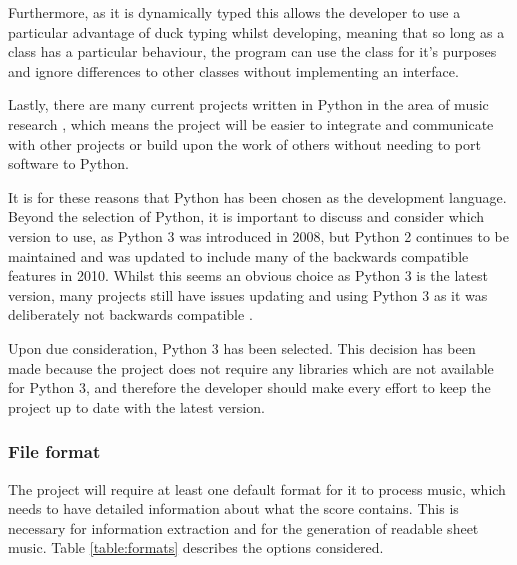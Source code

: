  Furthermore, as it is dynamically typed this allows the developer to use a particular advantage of duck typing whilst developing, meaning that so long as a class has a particular behaviour, the program can use the class for it's purposes and ignore differences to other classes without implementing an interface.
 
 Lastly, there are many current projects written in Python in the area of music research \parencite{pmus}, which means the project will be easier to integrate and communicate with other projects or build upon the work of others without needing to port software to Python.

It is for these reasons that Python has been chosen as the development language. Beyond the selection of Python, it is important to discuss and consider which version to use, as Python 3 was introduced in 2008, but Python 2 continues to be maintained and was updated to include many of the backwards compatible features in 2010. Whilst this seems an obvious choice as Python 3 is the latest version, many projects still have issues updating and using Python 3 as it was deliberately not backwards compatible \parencite{Foundation2}.

Upon due consideration, Python 3 has been selected. This decision has been made because the project does not require any libraries which are not available for Python 3, and therefore the developer should make every effort to keep the project up to date with the latest version.

\subsubsection{File format}
The project will require at least one default format for it to process music, which needs to have detailed information about what the score contains. This is necessary for information extraction and for the generation of readable sheet music. Table \ref{table:formats} describes the options considered.

